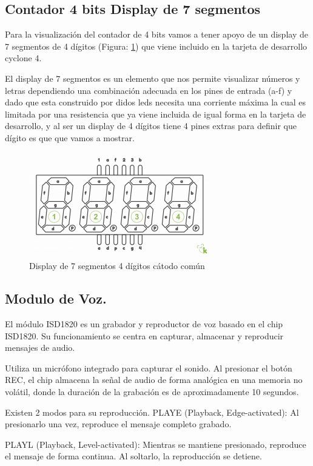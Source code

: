 \subsection*{Contador 4 bits Display de 7 segmentos}

Para la visualización del contador de 4 bits vamos a tener apoyo de un display de 7 segmentos de 4 dígitos (Figura: \ref{fig:display}) que viene incluido en la tarjeta de desarrollo cyclone 4.

El display de 7 segmentos es un elemento que nos permite visualizar números y letras dependiendo una combinación adecuada en los pines de entrada (a-f) y dado que esta construido por didos leds necesita una corriente máxima la cual es limitada por una resistencia que ya viene incluida de igual forma en la tarjeta de desarrollo, y al ser un display de 4 dígitos tiene 4 pines extras para definir que dígito es que que vamos a mostrar.

\begin{figure}[H]
    \centering
    \includegraphics[width=0.5\linewidth]{imagenes/7_segmenos.png}
    \caption{Display de 7 segmentos 4 dígitos cátodo común}
    \label{fig:display}
\end{figure}


\subsection*{Modulo de Voz.}

El módulo ISD1820 es un grabador y reproductor de voz basado en el chip ISD1820. Su funcionamiento se centra en capturar, almacenar y reproducir mensajes de audio.

Utiliza un micrófono integrado para capturar el sonido. Al presionar el botón REC, el chip almacena la señal de audio de forma analógica en una memoria no volátil, donde la duración de la grabación es de aproximadamente 10 segundos.

Existen 2 modos para su reproducción.
PLAYE (Playback, Edge-activated): Al presionarlo una vez, reproduce el mensaje completo grabado.

PLAYL (Playback, Level-activated): Mientras se mantiene presionado, reproduce el mensaje de forma continua. Al soltarlo, la reproducción se detiene.

